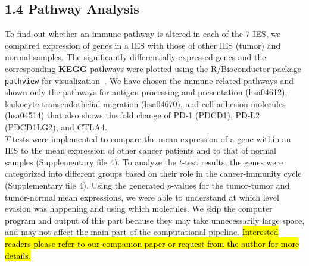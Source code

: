 \documentclass[a4paper, 11pt]{article}
\begin{document}
\subsection*{1.4 Pathway Analysis}
To find out whether an immune pathway is altered in each of the $7$ IES, we compared expression of genes in a IES with those of other IES (tumor) and normal samples. The significantly differentially expressed genes and the corresponding \textbf{KEGG} pathways were plotted using the R/Bioconductor package \texttt{pathview} for visualization~\citep{luo2013pathview}. We have chosen the immune related pathways and shown only the pathways for antigen processing and presentation (hsa04612), leukocyte transendothelial migration (hsa04670), and cell adhesion molecules (hsa04514) that also shows the fold change of PD-1 (PDCD1), PD-L2 (PDCD1LG2), and CTLA4.\\
$T$-tests were implemented to compare the mean expression of a gene within an IES to the mean expression of other cancer patients and to that of normal samples (Supplementary file 4). To analyze the $t$-test results, the genes were categorized into different groups based on their role in the cancer-immunity cycle (Supplementary file 4). Using the generated $p$-values for the tumor-tumor and tumor-normal mean expressions, we were able to understand at which level evasion was happening and using which molecules. We skip the computer program and output of this part because they may take unnecessarily large space, and may not affect the main part of the computational pipeline. \hl{Interested readers please refer to our companion paper or request from the author for more details.}
\end{document}

